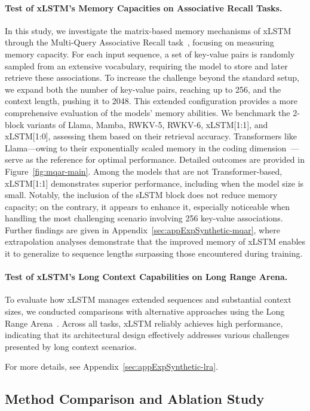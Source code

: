 \paragraph{Test of xLSTM's Memory Capacities on Associative Recall Tasks.} In this study, we investigate the matrix-based memory mechanisms of xLSTM through the Multi-Query Associative Recall task~\citep{Arora:23arxiv}, focusing on measuring memory capacity. For each input sequence, a set of key-value pairs is randomly sampled from an extensive vocabulary, requiring the model to store and later retrieve these associations. To increase the challenge beyond the standard setup, we expand both the number of key-value pairs, reaching up to 256, and the context length, pushing it to 2048. This extended configuration provides a more comprehensive evaluation of the models' memory abilities. We benchmark the 2-block variants of Llama, Mamba, RWKV-5, RWKV-6, xLSTM[1:1], and xLSTM[1:0], assessing them based on their retrieval accuracy. Transformers like Llama—owing to their exponentially scaled memory in the coding dimension~\citep{Ramsauer:21}—serve as the reference for optimal performance. Detailed outcomes are provided in Figure~\ref{fig:mqar-main}. Among the models that are not Transformer-based, xLSTM[1:1] demonstrates superior performance, including when the model size is small. Notably, the inclusion of the sLSTM block does not reduce memory capacity; on the contrary, it appears to enhance it, especially noticeable when handling the most challenging scenario involving 256 key-value associations. Further findings are given in Appendix~\ref{sec:appExpSynthetic-mqar}, where extrapolation analyses demonstrate that the improved memory of xLSTM enables it to generalize to sequence lengths surpassing those encountered during training.

\paragraph{Test of xLSTM's Long Context Capabilities on Long Range Arena.} To evaluate how xLSTM manages extended sequences and substantial context sizes, we conducted comparisons with alternative approaches using the Long Range Arena~\citep{Tay:21}. Across all tasks, xLSTM reliably achieves high performance, indicating that its architectural design effectively addresses various challenges presented by long context scenarios.

For more details, see Appendix~\ref{sec:appExpSynthetic-lra}.

\subsection{Method Comparison and Ablation Study}
\label{sec:ExpComparison}

